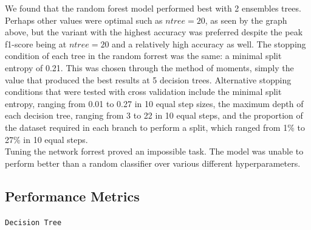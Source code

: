 \documentclass{article}
\begin{document}
We found that the random forest model performed best with 2 ensembles trees. Perhaps other values were optimal such as $ntree = 20$, as seen by the graph above, but
the variant with the highest accuracy was preferred despite the peak f1-score being at $ntree=20$ and a relatively high accuracy as well.
The stopping condition of each tree in the random forrest was the same: a minimal split entropy of 0.21. This was chosen through the method of moments, simply the value that produced the best results at 5 decision trees.
Alternative stopping conditions that were tested with cross validation include the minimal split entropy, ranging from 0.01 to 0.27 in 10 equal step sizes, the maximum depth of each decision tree, ranging from 3 to 22 in 10 equal steps,
and the proportion of the dataset required in each branch to perform a split, which ranged from 1\% to 27\% in 10 equal steps.
\\

Tuning the network forrest proved an impossible task. The model was unable to perform better than a random classifier over various different hyperparameters.

\subsection*{Performance Metrics}
\begin{center}
    \texttt{Decision Tree}
\end{center}
\end{document}
